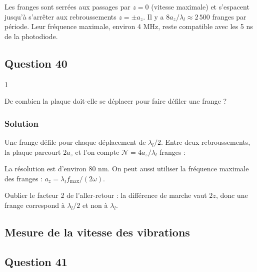 \documentclass[11pt,a4paper]{article}
\newcommand{\equationajustee}[1]{%
  \sbox{\boiteequation}{$\displaystyle #1$}%
  \ifdim\wd\boiteequation>\linewidth
    \[\resizebox{\linewidth}{!}{\usebox{\boiteequation}}\]%
  \else
    \[#1\]%
  \fi}
\begin{document}
Les franges sont serrées aux passages par \(z=0\) (vitesse maximale) et s'espacent jusqu'à s'arrêter aux rebroussements \(z=\pm a_z\). Il y a \(8a_z/\lambda_l\approx2\,500\) franges par période. Leur fréquence maximale, environ 4 MHz, reste compatible avec les 5 ns de la photodiode.

\hypertarget{question-40}{%
\subsection{Question 40}\label{question-40}}

\begin{indication}{1}

De combien la plaque doit-elle se déplacer pour faire défiler une frange ?

\end{indication}

\hypertarget{solution-39}{%
\subsubsection{Solution}\label{solution-39}}

Une frange défile pour chaque déplacement de \(\lambda_l/2\). Entre deux rebroussements, la plaque parcourt \(2a_z\) et l'on compte \(\mathcal N=4a_z/\lambda_l\) franges :

\equationajustee{\boxed{a_z=\frac{\mathcal N\lambda_l}{4}}}

La résolution est d'environ 80 nm. On peut aussi utiliser la fréquence maximale des franges : \(a_z=\lambda_lf_{\max}/(2\omega)\).

\begin{piege}

Oublier le facteur 2 de l'aller-retour : la différence de marche vaut \(2z\), donc une frange correspond à \(\lambda_l/2\) et non à \(\lambda_l\).

\end{piege}

\hypertarget{mesure-de-la-vitesse-des-vibrations}{%
\subsection{Mesure de la vitesse des vibrations}\label{mesure-de-la-vitesse-des-vibrations}}

\hypertarget{question-41}{%
\subsection{Question 41}\label{question-41}}
\end{document}
